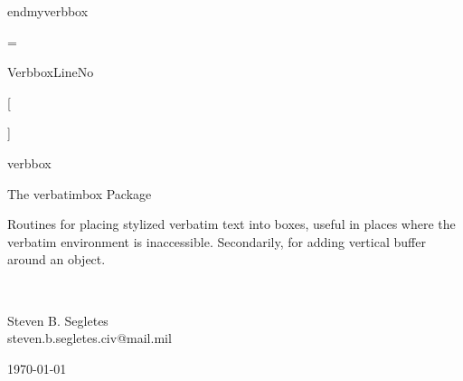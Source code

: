 \documentclass{article}
\def\vbx{\textsf{verbatimbox}}
\begin{document}
\begin{myverbbox}{\myvb}\begin{myverbbox}\end{myverbbox}
\begin{myverbbox}{\emyvb}end{myverbbox}\end{myverbbox}
\begin{myverbbox}{\vbfbox}\verbfilebox\end{myverbbox}
\begin{myverbbox}{\vbfnobox}\verbfilenobox\end{myverbbox}
\begin{myverbbox}{\tvb}\theverbbox\end{myverbbox}
\begin{myverbbox}{\avb}\addvbuffer\end{myverbbox}
\begin{myverbbox}{\bts}\boxtopsep\end{myverbbox}
\begin{myverbbox}{\bbs}\boxbottomsep\end{myverbbox}
\begin{myverbbox}{\eq} = \end{myverbbox}
\begin{myverbbox}{\vln}VerbboxLineNo\end{myverbbox}
\begin{myverbbox}{\lb}[\end{myverbbox}
\begin{myverbbox}{\rb}]\end{myverbbox}
\begin{myverbbox}{\lbr}{\end{myverbbox}
\begin{myverbbox}{\rbr}}\end{myverbbox}
\begin{myverbbox}[\footnotesize]{\fsvrbox}verbbox\end{myverbbox}
\begin{myverbbox}[\footnotesize]{\fbx}\fbox\end{myverbbox}
\begin{myverbbox}[\footnotesize]{\fbs}\fboxsep\end{myverbbox}

\begin{center}
\LARGE The {\vbx} Package\\
\rule{0em}{.7em}\small
{\centering
\begin{minipage}{.7\textwidth}%
Routines for placing stylized verbatim text into boxes, useful in 
places where the verbatim environment is inaccessible.  Secondarily, 
for adding vertical buffer around an object.
\end{minipage}
}\\
\rule{0em}{2.7em}\large Steven B. Segletes\\
steven.b.segletes.civ@mail.mil\\
\rule{0em}{1.7em}\today\\
\verbatimboxVersionNumber
\end{center}


\end{myverbbox}
\end{document}
